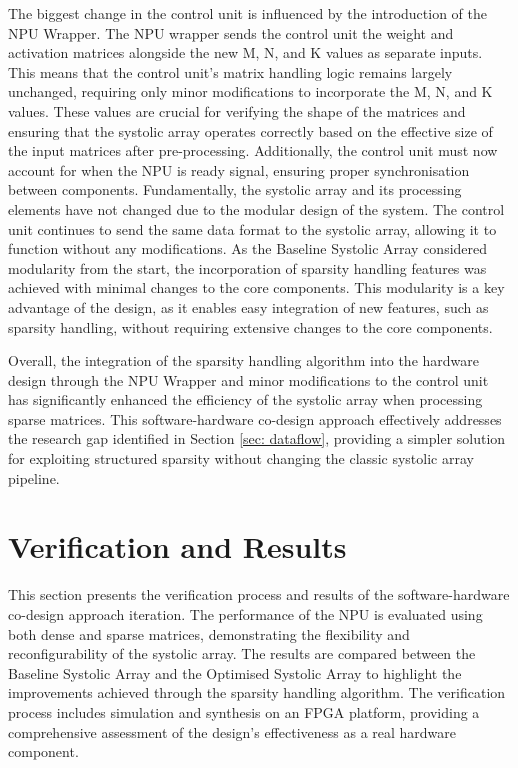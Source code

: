 \documentclass[12pt, a4paper, ukenglish]{article}
\begin{document}
    The biggest change in the control unit is influenced by the introduction of the NPU Wrapper. The NPU wrapper sends the control unit the weight and activation matrices alongside the new M, N, and K values as separate inputs. This means that the control unit's matrix handling logic remains largely unchanged, requiring only minor modifications to incorporate the M, N, and K values. These values are crucial for verifying the shape of the matrices and ensuring that the systolic array operates correctly based on the effective size of the input matrices after pre-processing. Additionally, the control unit must now account for when the NPU is  ready signal, ensuring proper synchronisation between components. Fundamentally, the systolic array and its processing elements have not changed due to the modular design of the system. The control unit continues to send the same data format to the systolic array, allowing it to function without any modifications. As the Baseline Systolic Array considered modularity from the start, the incorporation of sparsity handling features was achieved with minimal changes to the core components. This modularity is a key advantage of the design, as it enables easy integration of new features, such as sparsity handling, without requiring extensive changes to the core components.

    Overall, the integration of the sparsity handling algorithm into the hardware design through the NPU Wrapper and minor modifications to the control unit has significantly enhanced the efficiency of the systolic array when processing sparse matrices. This software-hardware co-design approach effectively addresses the research gap identified in Section \ref{sec: dataflow}, providing a simpler solution for exploiting structured sparsity without changing the classic systolic array pipeline.



    


    

    
\section{Verification and Results} \label{sec: verification}
    This section presents the verification process and results of the software-hardware co-design approach iteration. The performance of the NPU is evaluated using both dense and sparse matrices, demonstrating the flexibility and reconfigurability of the systolic array. The results are compared between the Baseline Systolic Array and the Optimised Systolic Array to highlight the improvements achieved through the sparsity handling algorithm. The verification process includes simulation and synthesis on an FPGA platform, providing a comprehensive assessment of the design's effectiveness as a real hardware component.
\end{document}
